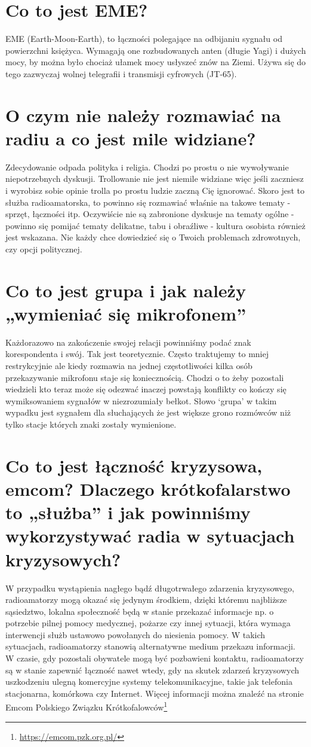 \documentclass[a4paper,12pt]{article}
\begin{document}
\section{Co to jest EME?}
EME (Earth-Moon-Earth), to łączności polegające na odbijaniu sygnału od powierzchni księżyca. Wymagają one rozbudowanych anten (długie Yagi) i dużych mocy, by można było chociaż ułamek mocy usłyszeć znów na Ziemi. Używa się do tego zazwyczaj wolnej telegrafii i transmisji cyfrowych (JT-65).

\section{O czym nie należy rozmawiać na radiu a co jest mile widziane?}
Zdecydowanie odpada polityka i religia. Chodzi po prostu o nie wywoływanie niepotrzebnych dyskusji. Trollowanie nie jest niemile widziane więc jeśli zaczniesz i wyrobisz sobie opinie trolla po prostu ludzie zaczną Cię ignorować.
Skoro jest to służba radioamatorska, to powinno się rozmawiać właśnie na takowe tematy - sprzęt, łączności itp. Oczywiście nie są zabronione dyskusje na tematy ogólne - powinno się pomijać tematy delikatne, tabu i obraźliwe - kultura osobista również jest wskazana. Nie każdy chce dowiedzieć się o Twoich problemach zdrowotnych, czy opcji politycznej.

\section{Co to jest grupa i jak należy „wymieniać się mikrofonem”}
Każdorazowo na zakończenie swojej relacji powinniśmy podać znak korespondenta i swój. Tak jest teoretycznie. Często traktujemy to mniej restrykcyjnie ale kiedy rozmawia na jednej częstotliwości kilka osób przekazywanie mikrofonu staje się koniecznością. Chodzi o to żeby pozostali wiedzieli kto teraz może się odezwać inaczej powstają konflikty co kończy się wymiksowaniem sygnałów w niezrozumiały bełkot. Słowo ‘grupa’ w takim wypadku jest sygnałem dla słuchających że jest większe grono rozmówców niż tylko stacje których znaki zostały wymienione.

\section{Co to jest łączność kryzysowa, emcom? Dlaczego krótkofalarstwo to „służba” i jak powinniśmy wykorzystywać radia w sytuacjach kryzysowych?}
W przypadku wystąpienia nagłego bądź długotrwałego zdarzenia kryzysowego, radioamatorzy mogą okazać się jedynym środkiem, dzięki któremu najbliższe sąsiedztwo, lokalna społeczność będą w stanie przekazać informacje np. o potrzebie pilnej pomocy medycznej, pożarze czy innej sytuacji, która wymaga interwencji służb ustawowo powołanych do niesienia pomocy. W takich sytuacjach, radioamatorzy stanowią alternatywne medium przekazu informacji. W czasie, gdy pozostali obywatele mogą być pozbawieni kontaktu, radioamatorzy są w stanie zapewnić łączność nawet wtedy, gdy na skutek zdarzeń kryzysowych uszkodzeniu ulegną komercyjne systemy telekomunikacyjne, takie jak telefonia stacjonarna, komórkowa czy Internet. Więcej informacji można znaleźć na stronie Emcom Polskiego Związku Krótkofalowców\footnote{\url{https://emcom.pzk.org.pl/}}
\end{document}
